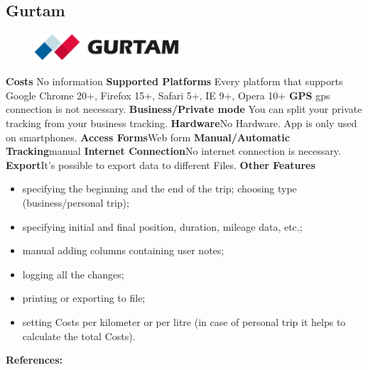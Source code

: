 \begin{singlespace}
\section{Gurtam}
\begin{figure}
  \begin{center}
    \includegraphics[width=0.48\textwidth]{bilder/gurtam}
  \end{center}
\end{figure}
\textbf{Costs} No information 
\newline\newline
\textbf{Supported Platforms} Every platform that supports  Google Chrome 20+, Firefox 15+, Safari 5+, IE 9+, Opera 10+
\newline\newline
\textbf{GPS} \gls{gps} connection is not necessary.
\newline\newline
\textbf{Business/Private mode} You can split your private tracking from your business tracking.
\newline\newline
\textbf{Hardware}No Hardware. App is only used on smartphones.
\newline\newline
\textbf{Access Forms}Web form
\newline\newline
\textbf{Manual/Automatic Tracking}manual
\newline\newline
\textbf{Internet Connection}No internet connection is necessary.
\newline\newline
\textbf{Export}It’s possible to export data to different Files.
\newline\newline
\textbf{Other Features}
\begin{itemize}
\item specifying the beginning and the end of the trip;
choosing type (business/personal trip);
\item specifying initial and final position, duration, mileage data, etc.;
\item manual adding columns containing user notes;
\item logging all the changes;
\item printing or exporting to file;
\item setting Costs per kilometer or per litre (in case of personal trip it helps to calculate the total Costs).
\end{itemize}
\textbf{References:} \cite{Gurtam_Wialon_Driving_Logbook}
\newpage
\clearpageauthor

\end{singlespace}
